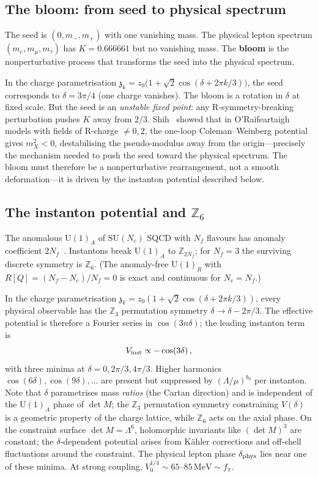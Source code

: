 \documentclass[aps,prd,twocolumn,showpacs,preprintnumbers,superscriptaddress,floatfix]{revtex4-2}
\newcommand{\SU}{\mathrm{SU}}
\newcommand{\UU}{\mathrm{U}}
\newcommand{\Nf}{N_{\!f}}
\newcommand{\Nc}{N_{\!c}}
\newcommand{\MeV}{\,\mathrm{MeV}}
\newcommand{\zch}{\mathfrak{z}}
\begin{document}
\subsection{The bloom: from seed to physical spectrum}

The seed is $(0, m_-, m_+)$ with one vanishing mass.
The physical lepton spectrum $(m_e, m_\mu, m_\tau)$ has
$K = 0.666661$ but no vanishing mass.
The \textbf{bloom} is the nonperturbative process that transforms
the seed into the physical spectrum.

In the charge parametrisation
$\zch_k = z_0\bigl(1 + \sqrt{2}\cos(\delta + 2\pi k/3)\bigr)$,
the seed corresponds to $\delta = 3\pi/4$ (one charge vanishes).
The bloom is a rotation in $\delta$ at fixed scale.
But the seed is an \emph{unstable fixed point}: any
R-symmetry-breaking perturbation pushes $K$ away from $2/3$.
Shih~\cite{Shih:2008} showed that in O'Raifeartaigh models with
fields of R-charge $\neq 0, 2$, the one-loop Coleman--Weinberg
potential gives $m_X^2 < 0$, destabilising the pseudo-modulus
away from the origin---precisely the mechanism needed to push the
seed toward the physical spectrum.
The bloom must therefore be a nonperturbative rearrangement,
not a smooth deformation---it is driven by the instanton
potential described below.


\subsection{The instanton potential and $\mathbb{Z}_6$}

The anomalous $\UU(1)_A$ of $\SU(\Nc)$ SQCD with $\Nf$ flavours
has anomaly coefficient $2\Nf$~\cite{Seiberg:1994bz,Tong:SUSY}.
Instantons break $\UU(1)_A$ to $\mathbb{Z}_{2\Nf}$;
for $\Nf = 3$ the surviving discrete symmetry is
$\mathbb{Z}_6$.
(The anomaly-free $\UU(1)_R$ with $R[Q] = (\Nf - \Nc)/\Nf = 0$
is exact and continuous for $\Nc = \Nf$.)

In the charge parametrisation
$\zch_k = z_0(1 + \sqrt{2}\cos(\delta + 2\pi k/3))$,
every physical observable has the $\mathbb{Z}_3$ permutation
symmetry $\delta \to \delta - 2\pi/3$.
The effective potential is therefore a Fourier series in
$\cos(3n\delta)$; the leading instanton term is
\begin{equation}
  V_{\rm inst} \propto -\cos(3\delta)\,,
  \label{eq:cos3delta}
\end{equation}
with three minima at $\delta = 0, 2\pi/3, 4\pi/3$.
Higher harmonics $\cos(6\delta), \cos(9\delta), \ldots$ are
present but suppressed by $(\Lambda/\mu)^{b_0}$ per
instanton.
Note that $\delta$ parametrises mass \emph{ratios}
(the Cartan direction) and is independent of the $\UU(1)_A$
phase of $\det M$; the $\mathbb{Z}_3$ permutation symmetry
constraining $V(\delta)$ is a geometric property of the charge
lattice, while $\mathbb{Z}_6$ acts on the axial phase.
On the constraint surface $\det M = \Lambda^6$, holomorphic
invariants like $(\det M)^3$ are constant;
the $\delta$-dependent potential arises from K\"ahler corrections
and off-shell fluctuations around the constraint.
The physical lepton phase $\delta_{\rm phys}$ lies near one
of these minima.
At strong coupling, $V_0^{1/4} \sim 65$--$85\MeV \sim f_\pi$.
\end{document}
